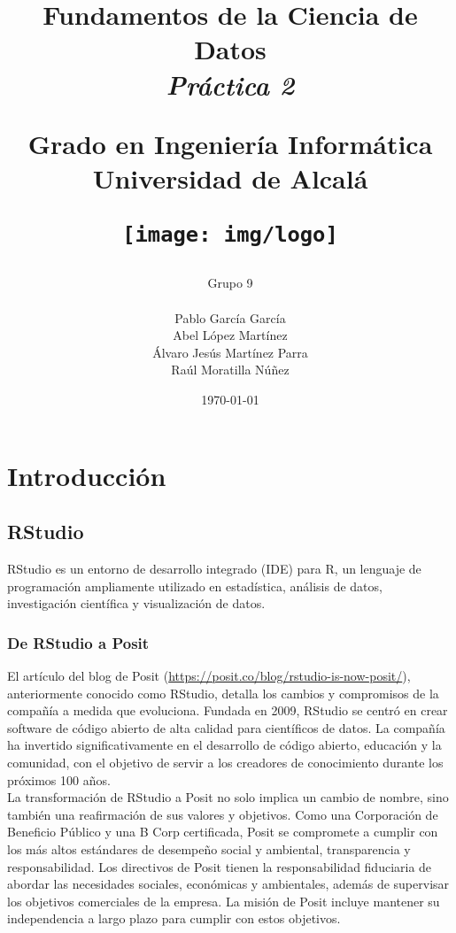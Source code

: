 \documentclass[12pt]{report}\usepackage[]{graphicx}\usepackage[dvipsnames]{xcolor}
\title{
	\huge
	\noindent\textbf{Fundamentos de la Ciencia de Datos}\\
	
	{\Large \textit{Práctica 2}}
	\vspace{1cm}
	
	\huge
	Grado en Ingeniería Informática\\
	Universidad de Alcalá\\
	
	\vspace{1cm}
	
	\texttt{[image: img/logo]}
}
\author{
	Grupo 9\\\\
	Pablo García García\\
	Abel López Martínez\\
	Álvaro Jesús Martínez Parra\\
	Raúl Moratilla Núñez
}
\date{
	\large{\today}
}
\begin{document}
	
	\renewcommand{\chaptername}{Parte}
	\renewcommand{\lstlistingname}{Código}
	\maketitle \thispagestyle{empty}
	
	\newpage
	
	\setcounter{tocdepth}{3}
	\tableofcontents
	
	\chapter*{Introducción}\pagestyle{plain}
	
	\section*{RStudio}
	
	RStudio es un entorno de desarrollo integrado (IDE) para R, un lenguaje de programación ampliamente utilizado en estadística, análisis de datos, investigación científica y visualización de datos.
	
	\subsection*{De RStudio a Posit}
	
	El artículo del blog de Posit (\url{https://posit.co/blog/rstudio-is-now-posit/}), anteriormente conocido como RStudio, detalla los cambios y compromisos de la compañía a medida que evoluciona. Fundada en 2009, RStudio se centró en crear software de código abierto de alta calidad para científicos de datos. La compañía ha invertido significativamente en el desarrollo de código abierto, educación y la comunidad, con el objetivo de servir a los creadores de conocimiento durante los próximos 100 años.\\
	
	La transformación de RStudio a Posit no solo implica un cambio de nombre, sino también una reafirmación de sus valores y objetivos. Como una Corporación de Beneficio Público y una B Corp certificada, Posit se compromete a cumplir con los más altos estándares de desempeño social y ambiental, transparencia y responsabilidad. Los directivos de Posit tienen la responsabilidad fiduciaria de abordar las necesidades sociales, económicas y ambientales, además de supervisar los objetivos comerciales de la empresa. La misión de Posit incluye mantener su independencia a largo plazo para cumplir con estos objetivos.\\
	
\end{document}
